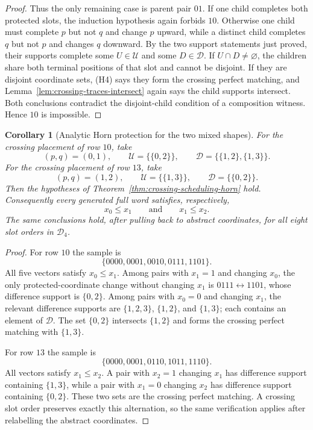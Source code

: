 \documentclass[11pt]{article}
\newtheorem{corollary}[definition]{Corollary}
\begin{document}
\begin{proof}
Thus the only remaining case is parent pair $01$.  If one child completes both
protected slots, the induction hypothesis again forbids $10$.  Otherwise one
child must complete $p$ but not $q$ and change $p$ upward, while a distinct
child completes $q$ but not $p$ and changes $q$ downward.  By the two support
statements just proved, their supports complete some
$U\in\mathcal U$ and some $D\in\mathcal D$.  If $U\cap D\ne\varnothing$, the
children share both terminal positions of that slot and cannot be disjoint.  If
they are disjoint coordinate sets, (H4) says they form the crossing perfect
matching, and Lemma~\ref{lem:crossing-traces-intersect} again says the child
supports intersect.  Both conclusions contradict the disjoint-child condition
of a composition witness.  Hence $10$ is impossible.
\end{proof}

\begin{corollary}[Analytic Horn protection for the two mixed shapes]
\label{cor:mixed-crossing-horn-analytic}
For the crossing placement of row $10$, take
\[
  (p,q)=(0,1),\qquad
  \mathcal U=\bigl\{\{0,2\}\bigr\},\qquad
  \mathcal D=\bigl\{\{1,2\},\{1,3\}\bigr\}.
\]
For the crossing placement of row $13$, take
\[
  (p,q)=(1,2),\qquad
  \mathcal U=\bigl\{\{1,3\}\bigr\},\qquad
  \mathcal D=\bigl\{\{0,2\}\bigr\}.
\]
Then the hypotheses of Theorem~\ref{thm:crossing-scheduling-horn} hold.
Consequently every generated full word satisfies, respectively,
\[
  x_0\le x_1
  \qquad\text{and}\qquad
  x_1\le x_2.
\]
The same conclusions hold, after pulling back to abstract coordinates, for all
eight slot orders in $\mathcal D_4$.
\end{corollary}

\begin{proof}
For row $10$ the sample is
\[
 \{0000,0001,0010,0111,1101\}.
\]
All five vectors satisfy $x_0\le x_1$.  Among pairs with $x_1=1$ and changing
$x_0$, the only protected-coordinate change without changing $x_1$ is
$0111\leftrightarrow1101$, whose difference support is $\{0,2\}$.  Among pairs
with $x_0=0$ and changing $x_1$, the relevant difference supports are
$\{1,2,3\}$, $\{1,2\}$, and $\{1,3\}$; each contains an element of
$\mathcal D$.  The set $\{0,2\}$ intersects $\{1,2\}$ and forms the crossing
perfect matching with $\{1,3\}$.

For row $13$ the sample is
\[
 \{0000,0001,0110,1011,1110\}.
\]
All vectors satisfy $x_1\le x_2$.  A pair with $x_2=1$ changing $x_1$ has
difference support containing $\{1,3\}$, while a pair with $x_1=0$ changing
$x_2$ has difference support containing $\{0,2\}$.  These two sets are the
crossing perfect matching.  A crossing slot order preserves exactly this
alternation, so the same verification applies after relabelling the abstract
coordinates.
\end{proof}
\end{document}
